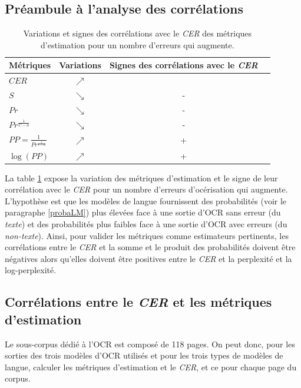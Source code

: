 \documentclass[10pt,twoside]{article}
\begin{document}
    \subsection{Préambule à l'analyse des corrélations}
    
        \begin{table}[h]
        \begin{center}
        \begin{tabular}{|l|c|c|c|}
        \hline
        \textbf{Métriques}  & \textbf{Variations} & \textbf{Signes des corrélations avec le \textit{CER}}    \\\hline
        $CER$  & $\nearrow$      &     \\ 
        $S$    & $\searrow$     & -   \\ 
        $Pr$    & $\searrow$     & -   \\
        $Pr^\frac{1}{C-n}$   & $\searrow$    & -    \\
        $PP=\frac{1}{Pr ^{\frac{1}{C-n}}}$ & $\nearrow$   & +   \\ 
        $\log \left (   PP   \right )$  & $\nearrow$      & + \\ 
        \hline
        \end{tabular}
        \caption{Variations et signes des corrélations avec le \textit{CER} des métriques d'estimation pour un nombre d'erreurs qui augmente.} \label{tab:var_cor}
        \end{center}
        \end{table}

    La table \ref{tab:var_cor} expose la variation des métriques d'estimation et le signe de leur 
    corrélation avec le \textit{CER} pour un nombre d'erreurs d'océrisation qui augmente. L'hypothèse est que les
    modèles de langue fournissent des probabilités (voir le paragraphe \ref{probaLM})
    plus élevées face à une sortie d'OCR sans erreur (du \textit{texte}) et des
    probabilités plus faibles face à une sortie d'OCR avec erreurs (du \textit{non-texte}). Ainsi, pour valider les métriques comme estimateurs pertinents, les corrélations entre le \textit{CER} et la somme et le produit des 
    probabilités doivent être négatives alors qu'elles doivent être positives entre le \textit{CER}
    et la perplexité et la log-perplexité.
    


    \subsection{Corrélations entre le \textit{CER} et les métriques d'estimation}
    Le sous-corpus dédié à l'OCR est composé de 118 pages. On peut donc, pour les sorties des trois modèles d'OCR utilisés et pour les trois types de modèles de langue, 
    calculer les métriques d'estimation et le \textit{CER}, et ce pour chaque page du corpus.
\end{document}
